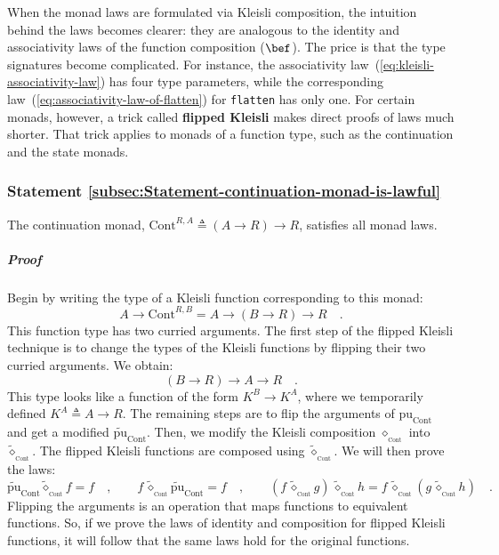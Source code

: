When the monad laws are formulated via Kleisli composition, the intuition
behind the laws becomes clearer: they are analogous to the identity
and associativity laws of the function composition ($\bef$). The
price is that the type signatures become complicated. For instance,
the associativity law~(\ref{eq:kleisli-associativity-law}) has four
type parameters, while the corresponding law~(\ref{eq:associativity-law-of-flatten})
for \lstinline!flatten! has only one. For certain monads, however,
a trick called \textbf{flipped
Kleisli} makes direct proofs of laws much shorter. That trick applies
to monads of a function type, such as the continuation and the state
monads.

\subsubsection{Statement \label{subsec:Statement-continuation-monad-is-lawful}\ref{subsec:Statement-continuation-monad-is-lawful}}

The continuation monad, $\text{Cont}^{R,A}\triangleq\left(A\rightarrow R\right)\rightarrow R$,
satisfies all monad laws.

\subparagraph{Proof}

Begin by writing the type of a Kleisli function corresponding to this
monad:
\[
A\rightarrow\text{Cont}^{R,B}=A\rightarrow\left(B\rightarrow R\right)\rightarrow R\quad.
\]
This function type has two curried arguments. The first step of the
flipped Kleisli technique is to change the types of the Kleisli functions
by flipping their two curried arguments. We obtain:
\[
\left(B\rightarrow R\right)\rightarrow A\rightarrow R\quad.
\]
This type looks like a function of the form $K^{B}\rightarrow K^{A}$,
where we temporarily defined $K^{A}\triangleq A\rightarrow R$. The
remaining steps are to flip the arguments of $\text{pu}_{\text{Cont}}$
and get a modified $\tilde{\text{pu}}_{\text{Cont}}$. Then, we modify
the Kleisli composition $\diamond_{_{\text{Cont}}}$ into $\tilde{\diamond}_{_{\text{Cont}}}$.
The flipped Kleisli functions are composed using $\tilde{\diamond}_{_{\text{Cont}}}$.
We will then prove the laws:
\[
\tilde{\text{pu}}_{\text{Cont}}\tilde{\diamond}_{_{\text{Cont}}}f=f\quad,\quad\quad f\,\tilde{\diamond}_{_{\text{Cont}}}\tilde{\text{pu}}_{\text{Cont}}=f\quad,\quad\quad(f\,\tilde{\diamond}_{_{\text{Cont}}}g)\,\tilde{\diamond}_{_{\text{Cont}}}h=f\,\tilde{\diamond}_{_{\text{Cont}}}(g\,\tilde{\diamond}_{_{\text{Cont}}}h)\quad.
\]
Flipping the arguments is an operation that maps functions to equivalent
functions. So, if we prove the laws of identity and composition for
flipped Kleisli functions, it will follow that the same laws hold
for the original functions.

